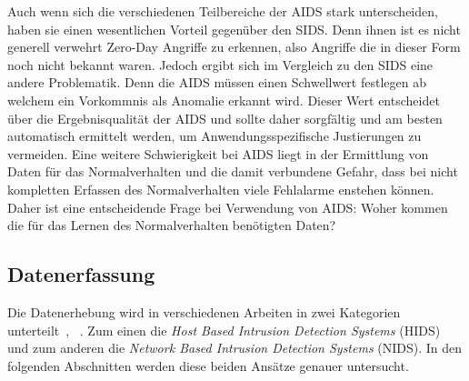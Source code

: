                 Auch wenn sich die verschiedenen Teilbereiche der AIDS stark unterscheiden,
                haben sie einen wesentlichen Vorteil gegenüber den SIDS\@.
                Denn ihnen ist es nicht generell verwehrt Zero-Day Angriffe zu erkennen,
                also Angriffe die in dieser Form noch nicht bekannt waren. 
                Jedoch ergibt sich im Vergleich zu den SIDS eine andere Problematik.
                Denn die AIDS müssen einen Schwellwert festlegen ab welchem ein Vorkommnis als Anomalie erkannt wird.
                Dieser Wert entscheidet über die Ergebnisqualität der AIDS 
                und sollte daher sorgfältig und am besten automatisch ermittelt werden,
                um Anwendungsspezifische Justierungen zu vermeiden. 
                Eine weitere Schwierigkeit bei AIDS liegt in der Ermittlung von Daten für das Normalverhalten und die damit verbundene Gefahr,
                dass bei nicht kompletten Erfassen des Normalverhalten viele Fehlalarme enstehen können.
                Daher ist eine entscheidende Frage bei Verwendung von AIDS\@: Woher kommen die für das Lernen des Normalverhalten benötigten Daten?

        \subsection{Datenerfassung}
        \label{sec:Datenerfassung}

            Die Datenerhebung wird in verschiedenen Arbeiten in zwei Kategorien unterteilt~\cite{IDSsurvey},
            ~\cite{IDSreview}.
            Zum einen die \textit{Host Based Intrusion Detection Systems} (HIDS) 
            und zum anderen die \textit{Network Based Intrusion Detection Systems} (NIDS).
            In den folgenden Abschnitten werden diese beiden Ansätze genauer untersucht.

